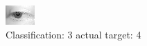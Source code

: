 \begin{figure}[h!]
\begin{center}
\includegraphics[width=0.60\columnwidth]{figures/ID2598_class_3_target_4.png}
\end{center}
\caption{ Classification: 3 actual target: 4}
\label{fig:ID2598_class_3_target_4}
\end{figure}

